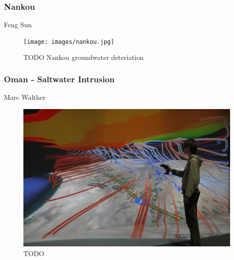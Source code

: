 \subsubsection{Nankou}
\label{nankou}

Feng Sun \cite{Sun:12}

\begin{figure}
  \texttt{[image: images/nankou.jpg]}
\caption{TODO Nankou groundwater deteriation}
\label{fig:nankou}
\end{figure}

\subsubsection{Oman - Saltwater Intrusion}
\label{oman---saltwater-intrusion}

Marc Walther \cite{Walther20124798}

\begin{figure}
  \includegraphics[width=\linewidth]{images/oman.jpg}
\caption{TODO}
\label{fig:oman}
\end{figure}

